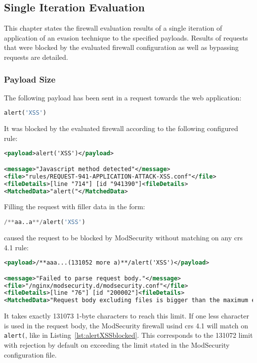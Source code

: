 \subsection{Single Iteration Evaluation}
\label{sec:singleiterationeva}
This chapter states the firewall evaluation results of a single iteration of application of an evasion technique to the specified payloads. Results of requests that were blocked by the evaluated firewall configuration as well as bypassing requests are detailed.

\subsubsection{Payload Size}
\label{sec:paylensingleiter}
The following payload has been sent in a request towards the web application:

\begin{lstlisting}[style=basicStyle, language=Python]
alert('XSS')
\end{lstlisting}
It was blocked by the evaluated firewall according to the following configured rule:

\begin{lstlisting}[style=ruleStyle, language=XML, caption=alert('XSS') blocked, label={lst:alertXSSblocked}]
<payload>alert('XSS')</payload>

<message>"Javascript method detected"</message>
<file>"rules/REQUEST-941-APPLICATION-ATTACK-XSS.conf"</file>
<fileDetails>[line "714"] [id "941390"]<fileDetails>
<MatchedData>"alert("</MatchedData>
\end{lstlisting}

Filling the request with filler data in the form: 

\begin{lstlisting}[style=basicStyle, language=Python]
/**aa..a**/alert('XSS')
\end{lstlisting}
caused the request to be blocked by ModSecurity without matching on any \acrshort{crs} 4.1 rule:

\begin{lstlisting}[style=ruleStyle, language=XML, caption=Request with body bigger than expected blocked, label={lst:requesttoobig}]
<payload>/**aaa...(131052 more a)**/alert('XSS')</payload>

<message>"Failed to parse request body."</message>
<file>"/nginx/modsecurity.d/modsecurity.conf"</file>
<fileDetails>[line "76"] [id "200002"]<fileDetails>
<MatchedData>"Request body excluding files is bigger than the maximum expected."</MatchedData>
\end{lstlisting}
It takes exactly 131073 1-byte characters to reach this limit. If one less character is used in the request body, the ModSecurity firewall usind \acrshort{crs} 4.1 will match on \verb|alert(|, like in Listing~\ref{lst:alertXSSblocked}. This corresponds to the 131072 limit with rejection by default on exceeding the limit stated in the ModSecurity configuration file.

